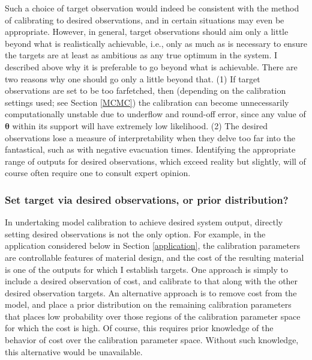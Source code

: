 \documentclass{article}
\begin{document}
Such a choice of target observation would indeed be consistent with the method of calibrating to desired observations, and in certain situations may even be appropriate. However, in general, target observations should aim only a little beyond what is realistically achievable, i.e., only as much as is necessary to ensure the targets are at least as ambitious as any true optimum in the system. I described above why it is preferable to go beyond what is achievable. There are two reasons why one should go only a little beyond that. (1) If target observations are set to be too farfetched, then (depending on the calibration settings used; see Section \ref{MCMC}) the calibration can become unnecessarily computationally unstable due  to underflow and round-off error, since any value of $\boldsymbol \theta$ within its support will have extremely low likelihood.
(2) The desired observations lose a measure of interpretability when they delve too far into the fantastical, such as with negative evacuation times. Identifying the appropriate range of outputs for desired observations, which exceed reality but slightly, will of course often require one to consult expert opinion. 

\subsubsection{Set target via desired observations, or prior distribution?}
In undertaking model calibration to achieve desired system output, directly setting desired observations is not the only option. For example, in the application considered below in Section \ref{application}, the calibration parameters are controllable features of material design, and the cost of the resulting material is one of the outputs for which I establish targets. 
One approach is simply to include a desired observation of cost, and calibrate to that along with the other desired observation targets. 
An alternative approach is to remove cost from the model, and place a prior distribution on the remaining calibration parameters that places low probability over those regions of the calibration parameter space for which the cost is high. Of course, this requires prior knowledge of the behavior of cost over the calibration parameter space. Without such knowledge, this alternative would be unavailable.
\end{document}
